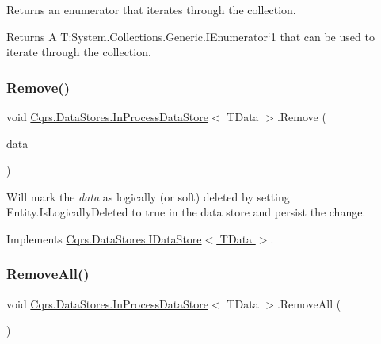 Returns an enumerator that iterates through the collection. 

\begin{DoxyReturn}{Returns}
A T\+:\+System.\+Collections.\+Generic.\+I\+Enumerator`1 that can be used to iterate through the collection. 
\end{DoxyReturn}
\mbox{\label{classCqrs_1_1DataStores_1_1InProcessDataStore_a43a93c614a403181e0641106ca9509d6_a43a93c614a403181e0641106ca9509d6}} 
\subsubsection{\texorpdfstring{Remove()}{Remove()}}
{\footnotesize\ttfamily void \hyperlink{classCqrs_1_1DataStores_1_1InProcessDataStore}{Cqrs.\+Data\+Stores.\+In\+Process\+Data\+Store}$<$ T\+Data $>$.Remove (\begin{DoxyParamCaption}\item[{T\+Data}]{data }\end{DoxyParamCaption})}



Will mark the {\itshape data}  as logically (or soft) deleted by setting Entity.\+Is\+Logically\+Deleted to true in the data store and persist the change. 



Implements \hyperlink{interfaceCqrs_1_1DataStores_1_1IDataStore_a7ef540796bbe4257296841590bc23478_a7ef540796bbe4257296841590bc23478}{Cqrs.\+Data\+Stores.\+I\+Data\+Store$<$ T\+Data $>$}.

\mbox{\label{classCqrs_1_1DataStores_1_1InProcessDataStore_acd350f7abef7311064434ae31a50755b_acd350f7abef7311064434ae31a50755b}} 
\subsubsection{\texorpdfstring{Remove\+All()}{RemoveAll()}}
{\footnotesize\ttfamily void \hyperlink{classCqrs_1_1DataStores_1_1InProcessDataStore}{Cqrs.\+Data\+Stores.\+In\+Process\+Data\+Store}$<$ T\+Data $>$.Remove\+All (\begin{DoxyParamCaption}{ }\end{DoxyParamCaption})}



